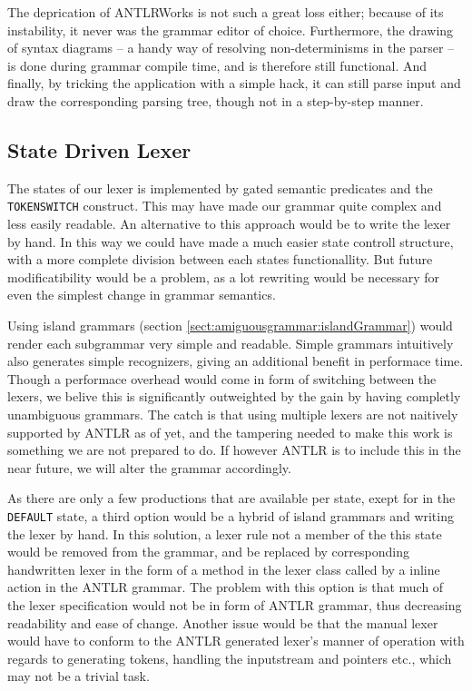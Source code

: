The deprication of ANTLRWorks is not such a great loss either; because of its instability, it never was the grammar editor of choice. Furthermore, the drawing of syntax diagrams -- a handy way of resolving non-determinisms in the parser -- is done during grammar compile time, and is therefore still functional. And finally, by tricking the application with a simple hack, it can still parse input and draw the corresponding parsing tree, though not in a step-by-step manner.

\subsection{State Driven Lexer}

The states of our lexer is implemented by gated semantic predicates and the \verb!TOKENSWITCH! construct. This may have made our grammar quite complex and less easily readable. An alternative to this approach would be to write the lexer by hand. In this way we could have made a much easier state controll structure, with a more complete division between each states functionallity. But future modificatibility would be a problem, as a lot rewriting would be necessary for even the simplest change in grammar semantics.

Using island grammars (section \ref{sect:amiguousgrammar:islandGrammar}) would render each subgrammar very simple and readable. Simple grammars intuitively also generates simple recognizers, giving an additional benefit in performace time. Though a performace overhead would come in form of switching between the lexers, we belive this is significantly outweighted by the gain by having completly unambiguous grammars. The catch is that using multiple lexers are not naitively supported by ANTLR as of yet, and the tampering needed to make this work is something we are not prepared to do. If however ANTLR is to include this in the near future, we will alter the grammar accordingly.

As there are only a few productions that are available per state, exept for in the \verb!DEFAULT! state, a third option would be a hybrid of island grammars and writing the lexer by hand. In this solution, a lexer rule not a member of the this state would be removed from the grammar, and be replaced by corresponding handwritten lexer in the form of a method in the lexer class called by a inline action in the ANTLR grammar. The problem with this option is that much of the lexer specification would not be in form of ANTLR grammar, thus decreasing readability and ease of change. Another issue would be that the manual lexer would have to conform to the ANTLR generated lexer's manner of operation with regards to generating tokens, handling the inputstream and pointers etc., which may not be a trivial task.